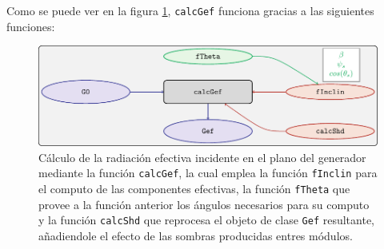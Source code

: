 Como se puede ver en la figura \ref{fig:calcgef}, \texttt{calcGef} funciona gracias a las siguientes funciones:
\begin{figure}[!htb]
\centering
\includegraphics[keepaspectratio,width=\textwidth,height=0.8\textheight]{figuras/calcgef.pdf}
\caption{Cálculo de la radiación efectiva incidente en el plano del generador mediante la función \texttt{calcGef}, la cual emplea la función \texttt{fInclin} para el computo de las componentes efectivas, la función \texttt{fTheta} que provee a la función anterior los ángulos necesarios para su computo y la función \texttt{calcShd} que reprocesa el objeto de clase \texttt{Gef} resultante, añadiendole el efecto de las sombras producidas entres módulos. \label{fig:calcgef}}
\end{figure}
\FloatBarrier
